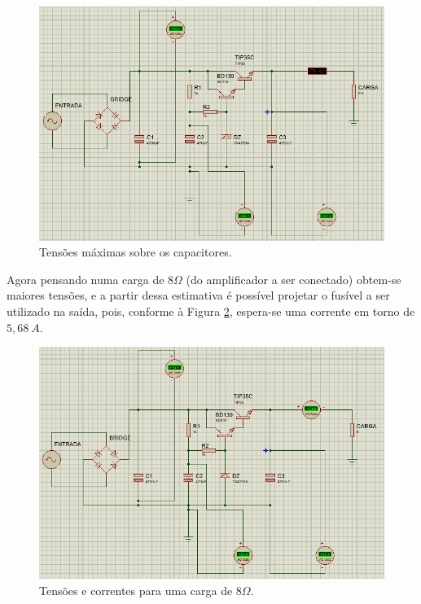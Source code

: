 \documentclass[a4paper,12pt,oneside,openany,table,xcdraw]{article}
\begin{document}
\begin{figure}[H]
\centering
\captionsetup{font=scriptsize}
\includegraphics[width=16cm]{sim2}
\caption{Tensões máximas sobre os capacitores.}
\label{sim2}
\end{figure}

Agora pensando numa carga de $8 \Omega$ (do amplificador a ser conectado) obtem-se maiores tensões, e a partir dessa estimativa é possível projetar o fusível a ser utilizado na saída, pois, conforme à Figura \ref{com-carga}, espera-se uma corrente em torno de $5,68\ A$.

\begin{figure}[H]
\centering
\captionsetup{font=scriptsize}
\includegraphics[width=16cm]{com-carga}
\caption{Tensões e correntes para uma carga de $8\Omega$.}
\label{com-carga}
\end{figure}
\end{document}
